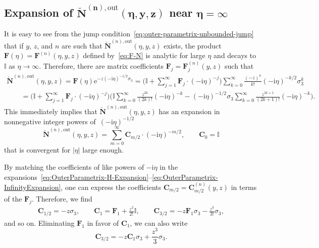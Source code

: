 \documentclass[pdftex]{sigma}
\numberwithin{equation}{section}
\begin{document}
\subsection[Expansion of breve\{N\}\^{}\{(n),out\}(eta,y,z) near eta = infty]{Expansion of $\boldsymbol{\breve{\mathbf{N}}^{(n),\mathrm{out}}(\eta,y,z)}$ near $\boldsymbol{\eta=\infty}$}

It is easy to see from the jump condition~\eqref{eq:outer-parametrix-unbounded-jump} that if $y$, $z$, and $n$ are such that $\breve{\mathbf{N}}^{(n),\mathrm{out}}(\eta,y,z)$ exists, the product $\mathbf{F}(\eta)=\mathbf{F}^{(n)}(\eta,y,z)$ defined by~\eqref{eq:F-N} is analytic for large $\eta$ and decays to $\mathbb{I}$ as $\eta\to\infty$. Therefore, there are matrix coefficients $\mathbf{F}_j=\mathbf{F}_j^{(n)}(y,z)$ such that
\begin{gather}
\breve{\mathbf{N}}^{(n),\mathrm{out}}(\eta,y,z)=\mathbf{F}(\eta)\mathrm{e}^{-z(-\mathrm{i}\eta)^{-1/2}\sigma_3}
 =\Bigg(\!\mathbb{I} + \sum_{j=1}^\infty\mathbf{F}_j\cdot(-\mathrm{i}\eta)^{-j}\!\Bigg)\sum_{k=0}^\infty\frac{(-z)^k}{k!}(-\mathrm{i}\eta)^{-k/2}\sigma_3^k \!\!\!\label{eq:OuterParametrix-H-Expansion}\\
\qquad=\Bigg(\mathbb{I} + \sum_{j=1}^\infty\mathbf{F}_j\cdot(-\mathrm{i}\eta)^{-j}\Bigg)\Bigg(\mathbb{I}\sum_{k=0}^\infty\frac{z^{2k}}{(2k)!}(-\mathrm{i}\eta)^{-k} - (-\mathrm{i}\eta)^{-1/2}\sigma_3\sum_{k=0}^\infty\frac{z^{2k+1}}{(2k+1)!}(-\mathrm{i}\eta)^{-k}\Bigg). \nonumber
\end{gather}
This immediately implies that $\breve{\mathbf{N}}^{(n),\mathrm{out}}(\eta,y,z)$ has an expansion in nonnegative integer powers of~$(-\mathrm{i}\eta)^{-1/2}$
\begin{equation}
\breve{\mathbf{N}}^{(n),\mathrm{out}}(\eta,y,z)=\sum_{m=0}^\infty \mathbf{C}_{m/2}\cdot (-\mathrm{i}\eta)^{-m/2},\qquad \mathbf{C}_0=\mathbb{I}
\label{eq:OuterParametrix-InfinityExpansion}
\end{equation}
that is convergent for $|\eta|$ large enough.

By matching the coefficients of like powers of $-\mathrm{i}\eta$ in the expansions~\eqref{eq:OuterParametrix-H-Expansion}--\eqref{eq:OuterParametrix-InfinityExpansion}, one can express the coefficients $\mathbf{C}_{m/2}=\mathbf{C}_{m/2}^{(n)}(y,z)$ in terms of the $\mathbf{F}_j$. Therefore, we find
\begin{gather}
 \mathbf{C}_{1/2} =-z\sigma_3,\qquad
 \mathbf{C}_1 = \mathbf{F}_1 + \frac{z^2}{2!}\mathbb{I},\qquad
 \mathbf{C}_{3/2} = -z\mathbf{F}_1\sigma_3 -\frac{z^3}{3!}\sigma_3,\label{eq:Cs-first}
\end{gather}
and so on. Eliminating $\mathbf{F}_1$ in favor of $\mathbf{C}_1$, we can also write
\begin{equation}
\mathbf{C}_{3/2}=-z\mathbf{C}_1\sigma_3 +\frac{z^3}{3}\sigma_3.
\label{eq:C3/2-C1}
\end{equation}
\end{document}
